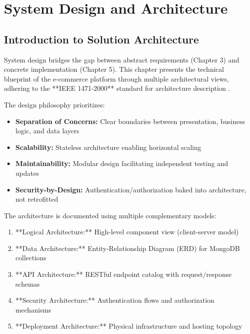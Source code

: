 
\chapter{System Design and Architecture}

\section{Introduction to Solution Architecture}

System design bridges the gap between abstract requirements (Chapter 3) and concrete implementation (Chapter 5). This chapter presents the technical blueprint of the e-commerce platform through multiple architectural views, adhering to the **IEEE 1471-2000** standard for architecture description \cite{ieee1471}.

The design philosophy prioritizes:
\begin{itemize}
    \item \textbf{Separation of Concerns:} Clear boundaries between presentation, business logic, and data layers
    \item \textbf{Scalability:} Stateless architecture enabling horizontal scaling
    \item \textbf{Maintainability:} Modular design facilitating independent testing and updates
    \item \textbf{Security-by-Design:} Authentication/authorization baked into architecture, not retrofitted
\end{itemize}

The architecture is documented using multiple complementary models:
\begin{enumerate}
    \item **Logical Architecture:** High-level component view (client-server model)
    \item **Data Architecture:** Entity-Relationship Diagram (ERD) for MongoDB collections
    \item **API Architecture:** RESTful endpoint catalog with request/response schemas
    \item **Security Architecture:** Authentication flows and authorization mechanisms
    \item **Deployment Architecture:** Physical infrastructure and hosting topology
\end{enumerate}

